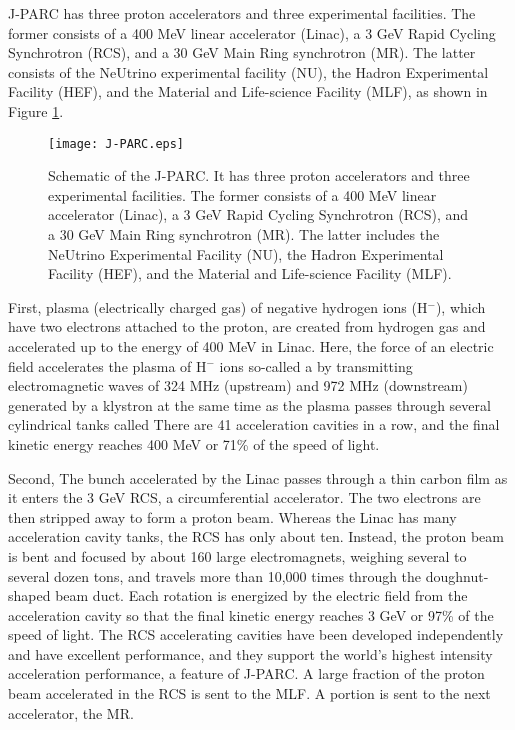 J-PARC has three proton accelerators and three experimental facilities. The former consists of a 400 MeV linear accelerator (Linac), a 3 GeV Rapid Cycling Synchrotron (RCS), and a 30 GeV Main Ring synchrotron (MR). The latter consists of the NeUtrino experimental facility (NU), the Hadron Experimental Facility (HEF), and the Material and Life-science Facility (MLF), as shown in Figure \ref{fig-J-PARC}. 
\begin{figure}[!h]
 \begin{center}
   \texttt{[image: J-PARC.eps]}
   \caption{Schematic of the J-PARC. It has three proton accelerators and three experimental facilities. The former consists of a 400 MeV linear accelerator (Linac), a 3 GeV Rapid Cycling Synchrotron (RCS), and a 30 GeV Main Ring synchrotron (MR). The latter includes the NeUtrino Experimental Facility (NU), the Hadron Experimental Facility (HEF), and the Material and Life-science Facility (MLF).}
   \label{fig-J-PARC}
 \end{center}
\end{figure}

First, plasma (electrically charged gas) of negative hydrogen ions (H$^-$), which have two electrons attached to the proton, are created from hydrogen gas and accelerated up to the energy of 400 MeV in Linac. Here, the force of an electric field accelerates the plasma of H$^-$ ions so-called a  by transmitting electromagnetic waves of 324 MHz (upstream) and 972 MHz (downstream) generated by a klystron at the same time as the plasma passes through several cylindrical tanks called  There are 41 acceleration cavities in a row, and the final kinetic energy reaches 400 MeV or 71\% of the speed of light.

Second, The bunch accelerated by the Linac passes through a thin carbon film as it enters the 3 GeV RCS, a circumferential accelerator. The two electrons are then stripped away to form a proton beam. Whereas the Linac has many acceleration cavity tanks, the RCS has only about ten. Instead, the proton beam is bent and focused by about 160 large electromagnets, weighing several to several dozen tons, and travels more than 10,000 times through the doughnut-shaped beam duct. Each rotation is energized by the electric field from the acceleration cavity so that the final kinetic energy reaches 3 GeV or 97\% of the speed of light. The RCS accelerating cavities have been developed independently and have excellent performance, and they support the world's highest intensity acceleration performance, a feature of J-PARC. A large fraction of the proton beam accelerated in the RCS is sent to the MLF. A portion is sent to the next accelerator, the MR.

